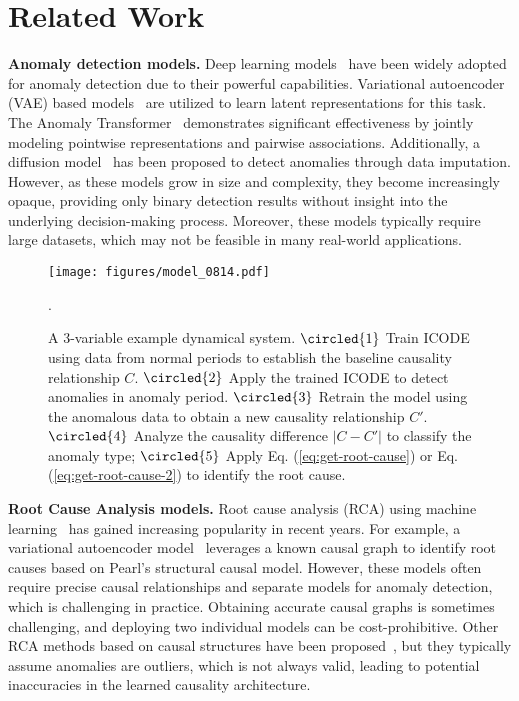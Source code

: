 \section{Related Work}
\textbf{Anomaly detection models.}
Deep learning models~\cite{pang2021deep} have been widely adopted for anomaly detection due to their powerful capabilities. 
Variational autoencoder (VAE) based models~\cite{zhou2021vae} are utilized to learn latent representations for this task. 
The Anomaly Transformer~\cite{xu2021anomaly} demonstrates significant effectiveness by jointly modeling pointwise representations and pairwise associations. 
Additionally, a diffusion model~\cite{xiao2023imputation} has been proposed to detect anomalies through data imputation. 
However, as these models grow in size and complexity, they become increasingly opaque, providing only binary detection results without insight into the underlying decision-making process. 
Moreover, these models typically require large datasets, which may not be feasible in many real-world applications.

\begin{figure*}
\centering
\texttt{[image: figures/model\_0814.pdf]} 
\caption{A 3-variable example dynamical system. 
$\protect\circled{1}$ Train ICODE using data from normal periods to establish the baseline causality relationship $C$.
$\protect\circled{2}$ Apply the trained ICODE to detect anomalies in anomaly period.
$\protect\circled{3}$ Retrain the model using the anomalous data to obtain a new causality relationship $C'$.
$\protect\circled{4}$ Analyze the causality difference $|C-C'|$ to classify the anomaly type; $\protect\circled{5}$ Apply Eq. (\ref{eq:get-root-cause}) or Eq. (\ref{eq:get-root-cause-2}) to identify the root cause.
}.

\label{fig:architecture}
\vspace{-0.27in}
\end{figure*}


\textbf{Root Cause Analysis models.}
Root cause analysis (RCA) using machine learning~\cite{lei2020applications, richens2020improving} has gained increasing popularity in recent years. 
For example, a variational autoencoder model~\cite{han2023root} leverages a known causal graph to identify root causes based on Pearl's structural causal model. 
However, these models often require precise causal relationships and separate models for anomaly detection, which is challenging in practice. 
Obtaining accurate causal graphs is sometimes challenging, and deploying two individual models can be cost-prohibitive. 
Other RCA methods based on causal structures have been proposed~\cite{budhathoki2022causal, wang2023interdependent}, but they typically assume anomalies are outliers, 
which is not always valid, leading to potential inaccuracies in the learned causality architecture.

